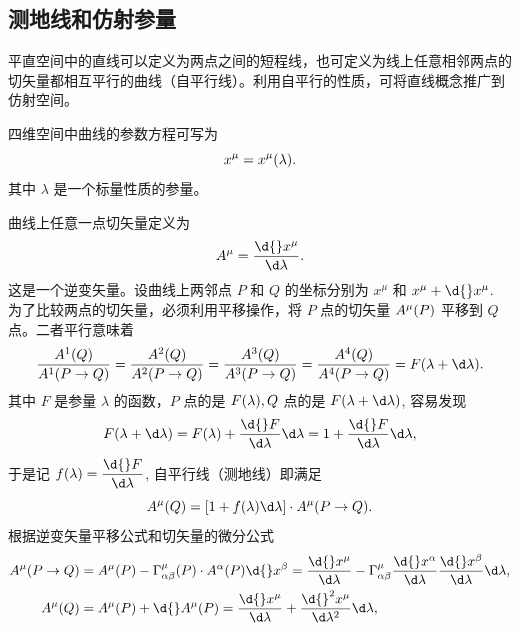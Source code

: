 \documentclass[UTF8, 12pt, a4paper, oneside, onecolumn, fontset=none]{ctexart}
\begin{document}
\subsection{测地线和仿射参量}
平直空间中的直线可以定义为两点之间的短程线，也可定义为线上任意相邻两点的切矢量都相互平行的曲线（自平行线）。利用自平行的性质，可将直线概念推广到仿射空间。

四维空间中曲线的参数方程可写为
\begin{equation}
x^{\mu}=x^{\mu}\mleft(\lambda\mright).
\end{equation}
其中 $\lambda$ 是一个标量性质的参量。

曲线上任意一点切矢量定义为
\begin{equation}
A^{\mu}=\frac{\d{}x^{\mu}}{\d\lambda}.
\end{equation}
这是一个逆变矢量。设曲线上两邻点 $P$ 和 $Q$ 的坐标分别为 $x^{\mu}$ 和 $x^{\mu}+\d{}x^{\mu}$. 为了比较两点的切矢量，必须利用平移操作，将 $P$ 点的切矢量 $A^{\mu}\mleft(P\mright)$ 平移到 $Q$ 点。二者平行意味着
\begin{equation}
\frac{A^{1}\mleft(Q\mright)}{A^{1}\mleft(P\to Q\mright)}=\frac{A^{2}\mleft(Q\mright)}{A^{2}\mleft(P\to Q\mright)}=\frac{A^{3}\mleft(Q\mright)}{A^{3}\mleft(P\to Q\mright)}=\frac{A^{4}\mleft(Q\mright)}{A^{4}\mleft(P\to Q\mright)}=F\mleft(\lambda+\d\lambda\mright).
\end{equation}
其中 $F$ 是参量 $\lambda$ 的函数，$P$ 点的是 $F\mleft(\lambda\mright), Q$ 点的是 $F\mleft(\lambda+\d\lambda\mright)$, 容易发现
\begin{equation}
F\mleft(\lambda+\d\lambda\mright)=F\mleft(\lambda\mright)+\frac{\d{}F}{\d\lambda}\d\lambda=1+\frac{\d{}F}{\d\lambda}\d\lambda,
\end{equation}
于是记 $f\mleft(\lambda\mright)=\dfrac{\d{}F}{\d\lambda}$, 自平行线（测地线）即满足
\begin{equation}
A^{\mu}\mleft(Q\mright)=\mleft[1+f\mleft(\lambda\mright)\d\lambda\mright]\cdot A^{\mu}\mleft(P\to Q\mright).
\end{equation}
根据逆变矢量平移公式和切矢量的微分公式
\begin{align}
A^{\mu}\mleft(P\to Q\mright)&=A^{\mu}\mleft(P\mright)-\Gamma_{\alpha\beta}^{\mu}\mleft(P\mright)\cdot A^{\alpha}\mleft(P\mright)\d{}x^{\beta}=\frac{\d{}x^{\mu}}{\d\lambda}-\Gamma_{\alpha\beta}^{\mu}\frac{\d{}x^{\alpha}}{\d\lambda}\frac{\d{}x^{\beta}}{\d\lambda}\d\lambda,\\
A^{\mu}\mleft(Q\mright)&=A^{\mu}\mleft(P\mright)+\d{}A^{\mu}\mleft(P\mright)=\frac{\d{}x^{\mu}}{\d\lambda}+\frac{\d{}^{2}x^{\mu}}{\d\lambda^{2}}\d\lambda,
\end{align}
\end{document}
